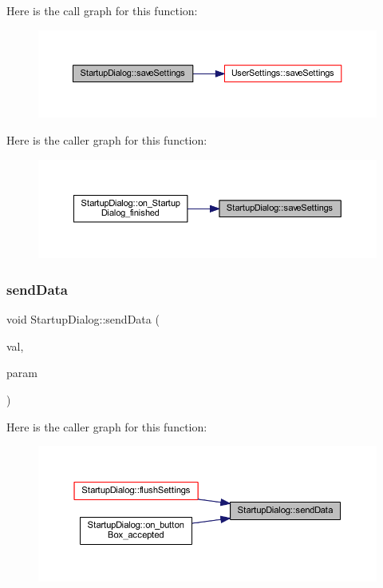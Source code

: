 Here is the call graph for this function\+:
\nopagebreak
\begin{figure}[H]
\begin{center}
\leavevmode
\includegraphics[width=350pt]{class_startup_dialog_a2c474c7787e0ea42958cb48f12f4e5c7_cgraph}
\end{center}
\end{figure}
Here is the caller graph for this function\+:
\nopagebreak
\begin{figure}[H]
\begin{center}
\leavevmode
\includegraphics[width=350pt]{class_startup_dialog_a2c474c7787e0ea42958cb48f12f4e5c7_icgraph}
\end{center}
\end{figure}
\mbox{\label{class_startup_dialog_a46bdde0c52c20bbcc06a48bfa25df5db}} 
\subsubsection{\texorpdfstring{sendData}{sendData}}
{\footnotesize\ttfamily void Startup\+Dialog\+::send\+Data (\begin{DoxyParamCaption}\item[{unsigned int}]{val,  }\item[{Q\+String}]{param }\end{DoxyParamCaption})\hspace{0.3cm}{\ttfamily [signal]}}

Here is the caller graph for this function\+:
\nopagebreak
\begin{figure}[H]
\begin{center}
\leavevmode
\includegraphics[width=350pt]{class_startup_dialog_a46bdde0c52c20bbcc06a48bfa25df5db_icgraph}
\end{center}
\end{figure}


